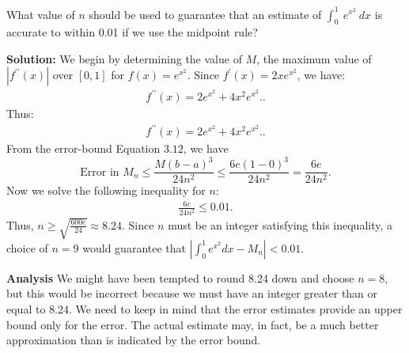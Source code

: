 \documentclass{report}
\begin{document}
        \pagebreak \bigbreak \noindent 
        \begin{eg}
            What value of  $n$ should be used to guarantee that an estimate of  $\int_{0}^{1}\ e^{x^{2}}\ dx $ is accurate to within 0.01 if we use the midpoint rule?
        \end{eg}
        \bigbreak \noindent 
        \textbf{Solution:}
        We begin by determining the value of $M$,  the maximum value of $|f^{\prime\prime}(x)|$ over $[0,1]$  for $f(x) = e^{x^2}$.  Since $f^{\prime}(x) = 2x e^{x^2}$,  we have:
        \begin{align*}
            f^{\prime\prime}(x) = 2e^{x^2} + 4x^2 e^{x^2}.
        .\end{align*}
        Thus:
        \begin{align*}
            f^{\prime\prime}(x) = 2e^{x^2} + 4x^2 e^{x^2}.
        .\end{align*}
        From the error-bound Equation \(3.12\), we have
        \[
            \text{Error in } M_n \leq \frac{M(b-a)^3}{24n^2} \leq \frac{6e(1-0)^3}{24n^2} = \frac{6e}{24n^2}.
        \]
        \bigbreak \noindent 
        Now we solve the following inequality for  $n$:
        \begin{align*}
            \frac{6e}{24n^{2}} \leq 0.01
        .\end{align*}
        Thus, \( n \geq \sqrt{\frac{600e}{24}} \approx 8.24 \). Since \( n \) must be an integer satisfying this inequality, a choice of \( n=9 \) would guarantee that \( \left| \int_0^1 e^{x^2} dx - M_n \right| < 0.01 \).

        \bigbreak \noindent 
        \textbf{Analysis}
        \bigbreak \noindent 
        We might have been tempted to round 8.24 down and choose $n=8 $, but this would be incorrect because we must have an integer greater than or equal to 8.24. We need to keep in mind that the error estimates provide an upper bound only for the error. The actual estimate may, in fact, be a much better approximation than is indicated by the error bound.

        \bigbreak \noindent 
\end{document}

